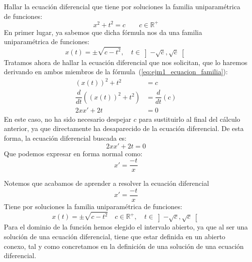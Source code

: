 \begin{ejemplo}
    Hallar la ecuación diferencial que tiene por soluciones la familia uniparamétrica de funciones:
    \begin{equation}\label{eq:ejm1_ecuacion_familia}
        x^2+t^2 = c\qquad c\in \mathbb{R}^+
    \end{equation}
    En primer lugar, ya sabemos que dicha fórmula nos da una familia uniparamétrica de funciones:
    \begin{equation*}
        x(t) = \pm \sqrt{c-t^2}, \quad t\in \left]-\sqrt{c},\sqrt{c}\right[
    \end{equation*}
    Tratamos ahora de hallar la ecuación diferencial que nos solicitan, que lo haremos derivando en ambos miembros de la fórmula~(\ref{eq:ejm1_ecuacion_familia}):
    \begin{align*}
        {(x(t))}^{2}+t^2 &= c \\
        \dfrac{d}{dt}\left({(x(t))}^{2}+t^2 \right) &= \dfrac{d}{dt}(c) \\
        2xx' + 2t &= 0
    \end{align*}
    En este caso, no ha sido necesario despejar $c$ para sustituirlo al final del cálculo anterior, ya que directamente ha desaparecido de la ecuación diferencial. De esta forma, la ecuación diferencial buscada es:
    \begin{equation*}
        2xx' + 2t = 0
    \end{equation*}
    Que podemos expresar en forma normal como:
    \begin{equation*}
        x' = \dfrac{-t}{x}
    \end{equation*}
\end{ejemplo}

\begin{observacion}\label{obs:3a_ec_dif}
    Notemos que acabamos de aprender a resolver la ecuación diferencial
    \begin{equation*}
        x' = \dfrac{-t}{x}
    \end{equation*}
    Tiene por soluciones la familia uniparamétrica de funciones:
    \begin{equation*}
        x(t) = \pm \sqrt{c-t^2} \quad c\in \mathbb{R}^+, \quad t\in \left]-\sqrt{c},\sqrt{c}\right[
    \end{equation*}
    Para el dominio de la función hemos elegido el intervalo abierto, ya que al ser una solución de una ecuación diferencial, tiene que estar definida en un abierto conexo, tal y como concretamos en la definición de una solución de una ecuación diferencial.
\end{observacion}


